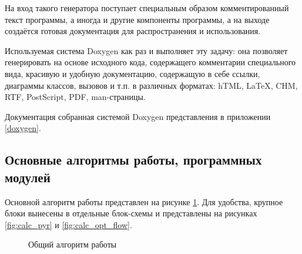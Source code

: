 На вход такого генератора поступает специальным образом комментированный текст программы, а иногда и другие компоненты программы, а на выходе создаётся готовая документация для распространения и использования.

Используемая система Doxygen как раз и выполняет эту задачу: она позволяет генерировать на основе исходного кода, содержащего комментарии специального вида, красивую и удобную документацию, содержащую в себе ссылки, диаграммы классов, вызовов и т.п. в различных форматах: hTML, LaTeX, CHM, RTF, PostScript, PDF, man-страницы.

Документация собранная системой Doxygen представления в приложении \ref{doxygen}.
\subsection{Основные алгоритмы работы, программных модулей}
Основной алгоритм работы представлен на рисунке \ref{fig:lucas_kanade_alg}. Для удобства, крупное блоки вынесены в отдельные блок-схемы и представлены на рисунках \ref{fig:calc_pyr} и \ref{fig:calc_opt_flow}.
\begin{figure}[h!]
\caption{Общий алгоритм работы}
\label{fig:lucas_kanade_alg}
\end{figure}
